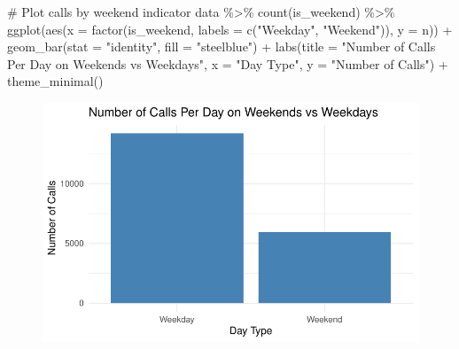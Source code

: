 \documentclass[
  letterpaper,
  DIV=11,
  numbers=noendperiod]{scrartcl}
\newenvironment{Shaded}{\begin{snugshade}}{\end{snugshade}}
\newcommand{\AttributeTok}[1]{\textcolor[rgb]{0.40,0.45,0.13}{#1}}
\newcommand{\CommentTok}[1]{\textcolor[rgb]{0.37,0.37,0.37}{#1}}
\newcommand{\FunctionTok}[1]{\textcolor[rgb]{0.28,0.35,0.67}{#1}}
\newcommand{\NormalTok}[1]{\textcolor[rgb]{0.00,0.23,0.31}{#1}}
\newcommand{\SpecialCharTok}[1]{\textcolor[rgb]{0.37,0.37,0.37}{#1}}
\newcommand{\StringTok}[1]{\textcolor[rgb]{0.13,0.47,0.30}{#1}}
\begin{document}
\begin{Shaded}
\begin{Highlighting}[]
\CommentTok{\# Plot calls by weekend indicator}
\NormalTok{data }\SpecialCharTok{\%\textgreater{}\%}
  \FunctionTok{count}\NormalTok{(is\_weekend) }\SpecialCharTok{\%\textgreater{}\%}
  \FunctionTok{ggplot}\NormalTok{(}\FunctionTok{aes}\NormalTok{(}\AttributeTok{x =} \FunctionTok{factor}\NormalTok{(is\_weekend, }\AttributeTok{labels =} \FunctionTok{c}\NormalTok{(}\StringTok{"Weekday"}\NormalTok{, }\StringTok{"Weekend"}\NormalTok{)), }\AttributeTok{y =}\NormalTok{ n)) }\SpecialCharTok{+}
  \FunctionTok{geom\_bar}\NormalTok{(}\AttributeTok{stat =} \StringTok{"identity"}\NormalTok{, }\AttributeTok{fill =} \StringTok{"steelblue"}\NormalTok{) }\SpecialCharTok{+}
  \FunctionTok{labs}\NormalTok{(}\AttributeTok{title =} \StringTok{"Number of Calls Per Day on Weekends vs Weekdays"}\NormalTok{, }\AttributeTok{x =} \StringTok{"Day Type"}\NormalTok{, }\AttributeTok{y =} \StringTok{"Number of Calls"}\NormalTok{) }\SpecialCharTok{+} \FunctionTok{theme\_minimal}\NormalTok{()}
\end{Highlighting}
\end{Shaded}

\begin{figure}[H]

{\centering \includegraphics{Report_files/figure-pdf/unnamed-chunk-7-1.pdf}

}

\end{figure}
\end{document}
